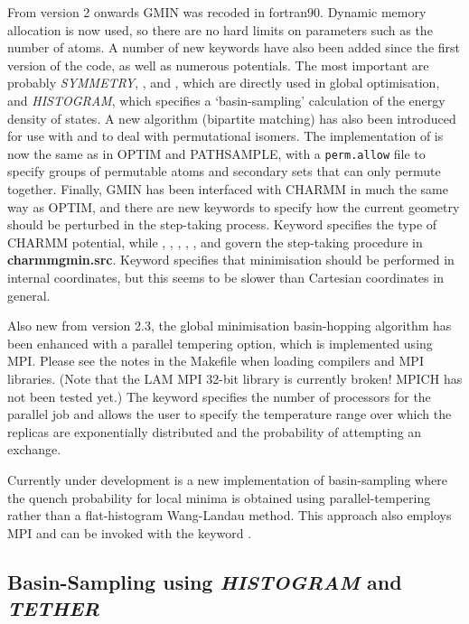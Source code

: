 From version 2 onwards GMIN was recoded in fortran90. 
Dynamic memory allocation is now used, so there are no hard limits on parameters
such as the number of atoms.
A number of new keywords have also been added since the first version of the code,
as well as numerous potentials.
The most important are probably {\it SYMMETRY}, {}, and {}, which 
are directly used in global optimisation, 
and {\it HISTOGRAM}, which specifies a `basin-sampling' calculation of the energy
density of states.
A new algorithm (bipartite matching) has also been introduced for use with {}
and {} to deal with permutational isomers.
The implementation of {} is now the same as in OPTIM
and PATHSAMPLE, with a {\tt perm.allow} file to specify groups of permutable
atoms and secondary sets that can only permute together.
Finally, GMIN has been interfaced with CHARMM in much the same way as OPTIM, and there
are new keywords to specify how the current geometry should be perturbed in the
step-taking process. Keyword  specifies the type of CHARMM potential,
while {}, {}, {}, {},
{}, and {} govern the step-taking procedure in {\bf charmmgmin.src}.
Keyword {} specifies that minimisation should be performed in internal coordinates,
but this seems to be slower than Cartesian coordinates in general.

Also new from version 2.3, the global minimisation basin-hopping algorithm has been enhanced with a 
parallel tempering option, which is implemented using MPI. Please see the notes
in the Makefile when loading compilers and MPI libraries. 
(Note that the LAM MPI 32-bit library is currently broken! MPICH has not been tested yet.)
The keyword {} specifies
the number of processors for the parallel job and {} allows the user to specify the temperature
range over which the replicas are exponentially distributed and the probability of attempting 
an exchange.

Currently under development is a new implementation of basin-sampling where 
the quench probability for local minima is obtained using parallel-tempering rather than
a flat-histogram Wang-Landau method. This approach also employs MPI and can be invoked with 
the keyword {}.

\subsection{Basin-Sampling using {\it HISTOGRAM} and {\it TETHER}}

